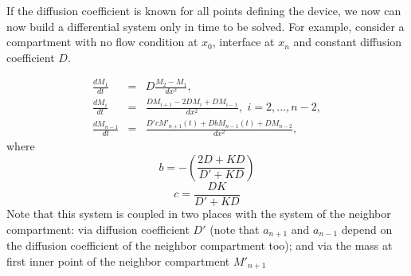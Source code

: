 \documentclass[final,1p,times]{elsarticle}
\begin{document}
If the diffusion coefficient is known for all points defining the device, we now can now build a differential system only in time to be solved. For example, consider a compartment with no flow condition at $x_0$, interface at $x_n$ and constant diffusion coefficient $D$.

\begin{eqnarray*}
\frac{d M_{1}}{dt}&=& D\frac{M_{2}-M_{1} }{dx^2},\\
\frac{d M_{i}}{dt}&=& \frac{DM_{i+1}-2D M_{i} + DM_{i-1}}{dx^2}, \,\, i=2,...,n-2,\\
\frac{d M_{n-1}}{dt}&=& \frac{D'c M'_{n+1}(t)+Db M_{n-1}(t)  + DM_{n-2}}{dx^2},
\end{eqnarray*}
where
\begin{equation}
b=-\left(\frac{2D+KD}{D'+KD}\right)
\end{equation}
\begin{equation}
c=\frac{D K }{D'+KD}
\end{equation}
Note that this system is coupled in two places with the system of the neighbor compartment: via diffusion coefficient $D'$ (note that $a_{n+1}$ and $a_{n-1}$ depend on the diffusion coefficient of the neighbor compartment too); and via the mass at first inner point of the neighbor compartment $M'_{n+1}$
\end{document}
